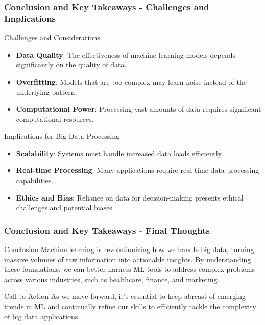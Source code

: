 \documentclass[aspectratio=169]{beamer}
\begin{document}
\begin{frame}[fragile]
    \frametitle{Conclusion and Key Takeaways - Challenges and Implications}
    \begin{block}{Challenges and Considerations}
        \begin{itemize}
            \item \textbf{Data Quality}: The effectiveness of machine learning models depends significantly on the quality of data.
            \item \textbf{Overfitting}: Models that are too complex may learn noise instead of the underlying pattern.
            \item \textbf{Computational Power}: Processing vast amounts of data requires significant computational resources.
        \end{itemize}
    \end{block}

    \begin{block}{Implications for Big Data Processing}
        \begin{itemize}
            \item \textbf{Scalability}: Systems must handle increased data loads efficiently.
            \item \textbf{Real-time Processing}: Many applications require real-time data processing capabilities.
            \item \textbf{Ethics and Bias}: Reliance on data for decision-making presents ethical challenges and potential biases.
        \end{itemize}
    \end{block}
\end{frame}

\begin{frame}[fragile]
    \frametitle{Conclusion and Key Takeaways - Final Thoughts}
    \begin{block}{Conclusion}
        Machine learning is revolutionizing how we handle big data, turning massive volumes of raw information into actionable insights. By understanding these foundations, we can better harness ML tools to address complex problems across various industries, such as healthcare, finance, and marketing.
    \end{block}

    \begin{block}{Call to Action}
        As we move forward, it's essential to keep abreast of emerging trends in ML and continually refine our skills to efficiently tackle the complexity of big data applications.
    \end{block}
\end{frame}
\end{document}
